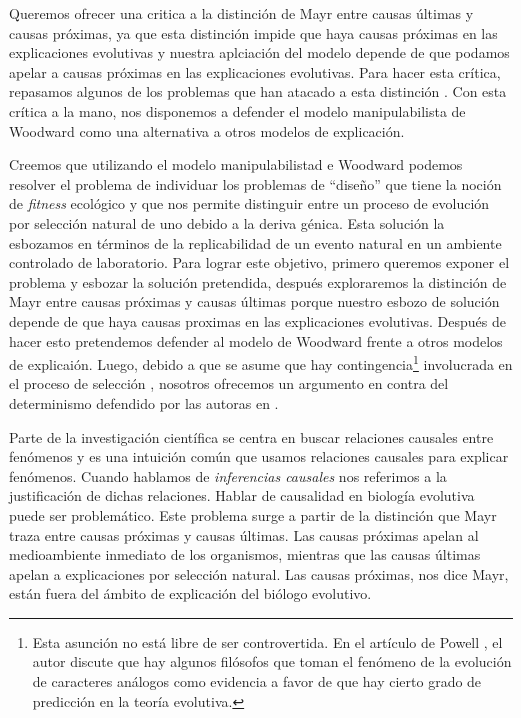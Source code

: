 Queremos ofrecer una critica a la distinción de Mayr entre causas últimas y causas próximas, ya que esta distinción impide que haya causas próximas en las explicaciones evolutivas y nuestra aplciación del modelo depende de que podamos apelar a causas próximas en las explicaciones evolutivas. Para hacer esta crítica, repasamos algunos de los problemas que han atacado a esta distinción \cite{Laland2011, Uller2019}. Con esta crítica a la mano, nos disponemos a defender el modelo manipulabilista de Woodward \cite{Woodward2000, Woodward2003} como una alternativa a otros modelos de explicación.

Creemos que utilizando el modelo manipulabilistad e Woodward podemos resolver el problema de individuar los problemas de ``diseño''  que tiene la noción de \emph{fitness} ecológico \cite{Bouchard2004, sep-fitness} y que nos permite distinguir entre un proceso de evolución por selección natural de uno debido a la deriva génica. Esta solución la esbozamos en términos de la replicabilidad de un evento natural en un ambiente controlado de laboratorio. Para lograr este objetivo, primero queremos exponer el problema y esbozar la solución pretendida, después exploraremos la distinción de Mayr entre causas próximas y causas últimas porque nuestro esbozo de solución depende de que haya causas proximas en las explicaciones evolutivas. Después de hacer esto pretendemos defender al modelo de Woodward frente a otros modelos de explicaión. Luego, debido a que se asume que hay contingencia\footnote{Esta asunción no está libre de ser controvertida. En el artículo de Powell \citeyear{Powell2012}, el autor discute que hay algunos filósofos que toman el fenómeno de la evolución de caracteres análogos como evidencia a favor de que hay cierto grado de predicción en la teoría evolutiva.} involucrada en el proceso de selección \cite{Scriven1959, Mayr1998}, nosotros ofrecemos un argumento en contra del determinismo defendido por las autoras en \cite{Graves1999}.

Parte de la investigación científica se centra en buscar relaciones causales entre fenómenos y es una intuición común que usamos relaciones causales para explicar fenómenos. Cuando hablamos de \textit{inferencias causales} nos referimos a la justificación de dichas relaciones. Hablar de causalidad en biología evolutiva puede ser problemático. Este problema surge a partir de la distinción que Mayr \cite{Mayr1998} traza entre causas próximas y causas últimas. Las causas próximas apelan al medioambiente inmediato de los organismos, mientras que las causas últimas apelan a explicaciones por selección natural. Las causas próximas, nos dice Mayr, están fuera del ámbito de explicación del biólogo evolutivo.

